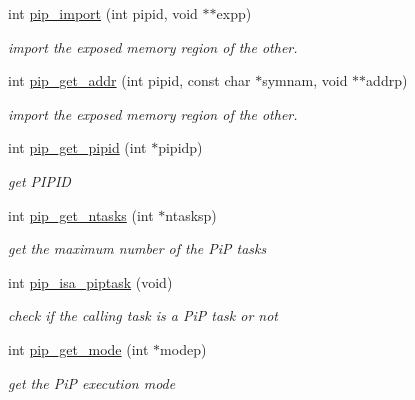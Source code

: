 \begin{DoxyCompactItemize}
\item 
int \hyperlink{group__libpip_ga6d7ac596a9da824e40d7c06528f42e5f}{pip\-\_\-import} (int pipid, void $\ast$$\ast$expp)
\begin{DoxyCompactList}\small\item\em import the exposed memory region of the other. \end{DoxyCompactList}\end{DoxyCompactItemize}
\begin{DoxyCompactItemize}
\item 
int \hyperlink{group__libpip_gaa0f8ce0138a1abb22ee5cb4d2230abc5}{pip\-\_\-get\-\_\-addr} (int pipid, const char $\ast$symnam, void $\ast$$\ast$addrp)
\begin{DoxyCompactList}\small\item\em import the exposed memory region of the other. \end{DoxyCompactList}\end{DoxyCompactItemize}
\begin{DoxyCompactItemize}
\item 
int \hyperlink{group__libpip_ga4e715bb8c325e9acc81af0745908dc0e}{pip\-\_\-get\-\_\-pipid} (int $\ast$pipidp)
\begin{DoxyCompactList}\small\item\em get P\-I\-P\-I\-D \end{DoxyCompactList}\end{DoxyCompactItemize}
\begin{DoxyCompactItemize}
\item 
int \hyperlink{group__libpip_ga9786d5aafa2a3882714c35ecc9f39a5a}{pip\-\_\-get\-\_\-ntasks} (int $\ast$ntasksp)
\begin{DoxyCompactList}\small\item\em get the maximum number of the Pi\-P tasks \end{DoxyCompactList}\end{DoxyCompactItemize}
\begin{DoxyCompactItemize}
\item 
int \hyperlink{group__libpip_ga4b6905e1eb5ffa6427d72d7e73408639}{pip\-\_\-isa\-\_\-piptask} (void)
\begin{DoxyCompactList}\small\item\em check if the calling task is a Pi\-P task or not \end{DoxyCompactList}\end{DoxyCompactItemize}
\begin{DoxyCompactItemize}
\item 
int \hyperlink{group__libpip_gab603f68c1ce972a5f3bfb8c95fcfb555}{pip\-\_\-get\-\_\-mode} (int $\ast$modep)
\begin{DoxyCompactList}\small\item\em get the Pi\-P execution mode \end{DoxyCompactList}\end{DoxyCompactItemize}
